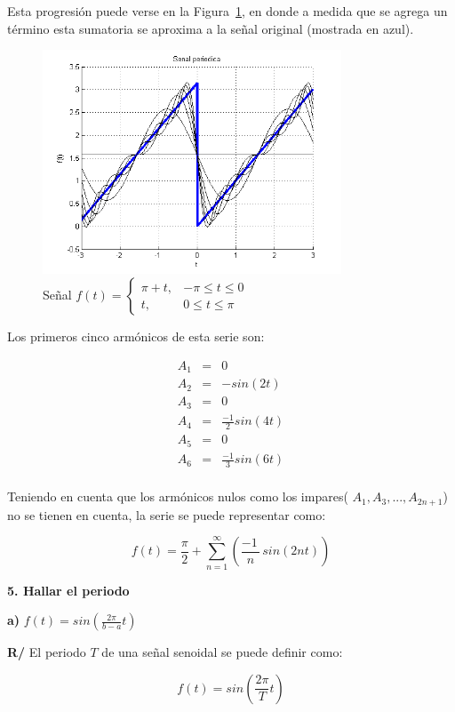 \documentclass[twocolumn]{article}
\begin{document}
Esta progresión puede verse en la Figura~\ref{fig_1d}, en donde a medida que se agrega un término esta sumatoria se aproxima a la señal original (mostrada en azul).

\begin{figure}[!t]
\centering
\includegraphics[width=3.5in]{imgs/piece.png}
\caption{Señal $f(t) = \begin{cases}
\pi +t, &-\pi \leq t \leq 0\\
t, &0 \leq t \leq \pi \end{cases}$}
\label{fig_1d}
\end{figure}

Los primeros cinco armónicos de esta serie son:

\begin{eqnarray*}
A_1 &=& 0 \\
A_2 &=& - sin(2t) \\
A_3 &=& 0 \\
A_4 &=& \frac{-1}{2} sin(4t) \\
A_5 &=& 0 \\
A_6 &=& \frac{-1}{3} sin(6t) \\
\end{eqnarray*}

Teniendo en cuenta que los armónicos nulos como los impares( $A_1 , A_3,..., A_{2n+1}$) no se tienen en cuenta, la serie se puede representar como:

$$f(t) = \frac{\pi}{2} + \sum_{n=1}^\infty\left( \frac{ -1 \,}{n} \,sin(2 n t) \right)$$



\textbf{5. Hallar el periodo}

\textbf{a)} $f(t) = sin(\frac{2\pi}{b-a}t)$

\textbf{R/} El periodo $T$ de una señal senoidal se puede definir como:

$$f(t) = sin\left(\frac{2\pi}{T}t\right)$$
\end{document}
